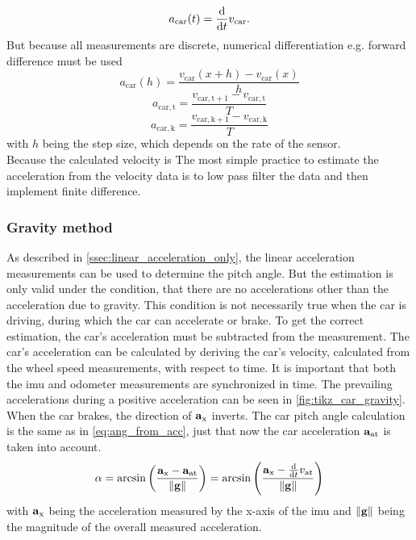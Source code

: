 \begin{equation}
	a_\mathrm{car}(t) = \dv{t}v_\mathrm{car}.
\end{equation}
But because all measurements are discrete, numerical differentiation e.g. forward difference must be used
\begin{equation}
	a_\mathrm{car}(h) = \frac{v_\mathrm{car}(x + h) - v_\mathrm{car}(x)}{h}
\end{equation}
\begin{equation}
	a_\mathrm{car, t} = \frac{v_\mathrm{car, t + 1} - v_\mathrm{car, t}}{T}
\end{equation}
\begin{equation}
	a_\mathrm{car, k} = \frac{v_\mathrm{car, k + 1} - v_\mathrm{car, k}}{T}
\end{equation}
with $h$ being the step size, which depends on the rate of the sensor.\\
Because the calculated velocity is
The most simple practice to estimate the acceleration from the velocity data is to low pass filter the data and then implement finite difference.

\subsubsection{Gravity method}
\label{subsubsec:gravity_method}
As described in \cref{ssec:linear_acceleration_only}, the linear acceleration measurements can be used to determine the pitch angle.
But the estimation is only valid under the condition, that there are no accelerations other than the acceleration due to gravity.
This condition is not necessarily true when the car is driving, during which the car can accelerate or brake.
To get the correct estimation, the car's acceleration must be subtracted from the measurement.
The car's acceleration can be calculated by deriving the car's velocity, calculated from the wheel speed measurements, with respect to time.
It is important that both the \gls{imu} and odometer measurements are synchronized in time.
The prevailing accelerations during a positive acceleration can be seen in \cref{fig:tikz_car_gravity}.
When the car brakes, the direction of $\vb{a}_\mathrm{x}$ inverts.
The car pitch angle calculation is the same as in \cref{eq:ang_from_acc}, just that now the car acceleration $\vb{a}_\mathrm{at}$ is taken into account.
\begin{equation}
	\alpha = \arcsin\left(\frac{\vb{a}_\mathrm{x} - \vb{a}_\mathrm{at}}{\norm{\vb{g}}}\right)
	= \arcsin\left(\frac{\vb{a}_\mathrm{x} - \dv{t}v_\mathrm{at} }{\norm{\vb{g}}}\right)
\end{equation}
with $\vb{a}_\mathrm{x}$ being the acceleration measured by the x-axis of the \gls{imu} and $\norm{\vb{g}}$ being the magnitude of the overall measured acceleration.